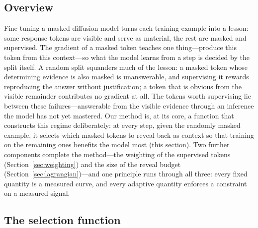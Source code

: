 \documentclass{article} %
\begin{document}
\subsection{Overview}
\label{sec:motivation}

Fine-tuning a masked diffusion model turns each training example into a lesson: some response tokens are visible and serve as material, the rest are masked and supervised. The gradient of a masked token teaches one thing---produce this token from this context---so what the model learns from a step is decided by the split itself. A random split squanders much of the lesson: a masked token whose determining evidence is also masked is unanswerable, and supervising it rewards reproducing the answer without justification; a token that is obvious from the visible remainder contributes no gradient at all. The tokens worth supervising lie between these failures---answerable from the visible evidence through an inference the model has not yet mastered. Our method is, at its core, a function that constructs this regime deliberately: at every step, given the randomly masked example, it selects which masked tokens to reveal back as context so that training on the remaining ones benefits the model most (this section). Two further components complete the method---the weighting of the supervised tokens (Section~\ref{sec:weighting}) and the size of the reveal budget (Section~\ref{sec:lagrangian})---and one principle runs through all three: every fixed quantity is a measured curve, and every adaptive quantity enforces a constraint on a measured signal.

\subsection{The selection function}
\label{sec:objective}
\end{document}
